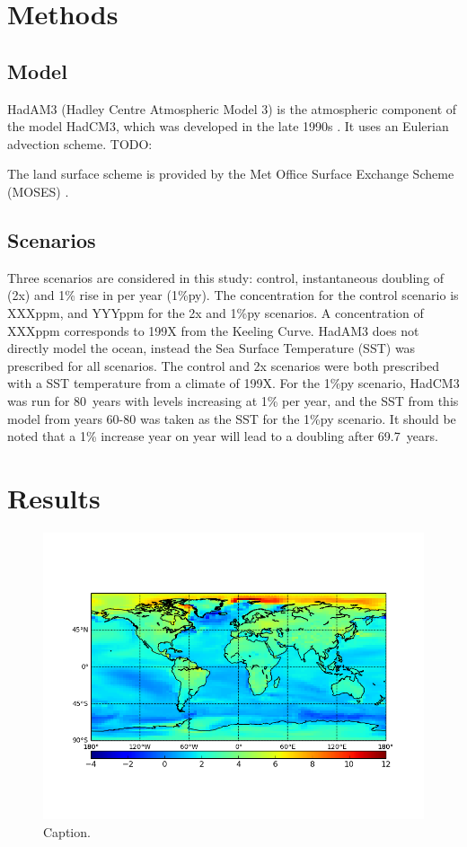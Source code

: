 \documentclass{article}
\begin{document}
\section{Methods}

\subsection{Model}

HadAM3 (Hadley Centre Atmospheric Model 3) is the atmospheric component of the model HadCM3, which was developed in the late 1990s \parencite{pope2000impact}. It uses an Eulerian advection scheme. TODO:

The land surface scheme is provided by the Met Office Surface Exchange Scheme (MOSES) \parencite{cox1999impact}.


\subsection{Scenarios}

Three scenarios are considered in this study: control, instantaneous doubling of  (2x) and 1\% rise in  per year (1\%py). The  concentration for the control scenario is XXXppm, and YYYppm for the 2x and 1\%py scenarios. A concentration of XXXppm corresponds to 199X from the Keeling Curve. HadAM3 does not directly model the ocean, instead the Sea Surface Temperature (SST) was prescribed for all scenarios. The control and 2x scenarios were both prescribed with a SST temperature from a climate of 199X. For the 1\%py scenario, HadCM3 was run for \SI{80}{years} with  levels increasing at 1\% per year, and the SST from this model from years 60-80 was taken as the SST for the 1\%py scenario. It should be noted that a 1\% increase year on year will lead to a doubling after \SI{69.7}{years}.


\section{Results}

\begin{figure}[hbp]
    \centering
    \includegraphics[width=\textwidth]{figures/figure_1}
    \caption{Caption.}
    \label{fig:figure_1}
\end{figure}
\end{document}
